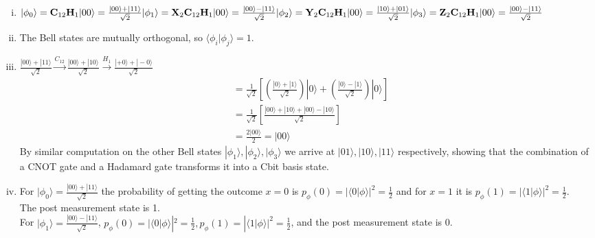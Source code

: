 \documentclass[11pt]{article}
\newenvironment{solution}{\begin{mdframed}[skipabove=\baselineskip,innertopmargin=\baselineskip,innerbottommargin=\baselineskip]
  }{\end{mdframed}}
\begin{document}
\begin{solution}
\begin{enumerate}[(i)]
    \item $
    |\phi_0\rangle = \textbf{C}_{12}\textbf{H}_1|00\rangle = \frac{|00\rangle+|11\rangle}{\sqrt{2}}\\
    |\phi_1\rangle = \textbf{X}_2\textbf{C}_{12}\textbf{H}_1|00\rangle = \frac{|00\rangle-|11\rangle}{\sqrt{2}}\\
    |\phi_2\rangle = \textbf{Y}_2\textbf{C}_{12}\textbf{H}_1|00\rangle = \frac{|10\rangle+|01\rangle}{\sqrt{2}}\\
    |\phi_3\rangle = \textbf{Z}_2\textbf{C}_{12}\textbf{H}_1|00\rangle = \frac{|00\rangle-|11\rangle}{\sqrt{2}}$
    
    \item The Bell states are mutually orthogonal, so $\langle\phi_i|\phi_j\rangle = 1$.
    
    \item $\frac{|00\rangle+|11\rangle}{\sqrt{2}} \xrightarrow{C_{12}} 
    \frac{|00\rangle+|10\rangle}{\sqrt{2}} \xrightarrow{H_1} \frac{|+0\rangle+|-0\rangle}{\sqrt{2}}$
    \begin{align*}
        &= \frac{1}{\sqrt{2}}\left[\left(\frac{|0\rangle+|1\rangle}{\sqrt{2}}\right)|0\rangle + \left(\frac{|0\rangle-|1\rangle}{\sqrt{2}}\right)|0\rangle\right] \\
        &= \frac{1}{\sqrt{2}}\left[ \frac{|00\rangle+|10\rangle+|00\rangle-|10\rangle}{\sqrt{2}} \right] \\
        &= \frac{2|00\rangle}{2} = |00\rangle
    \end{align*}
    By similar computation on the other Bell states $|\phi_1\rangle,|\phi_2\rangle,|\phi_3\rangle$ we arrive at $|01\rangle,|10\rangle,|11\rangle$ respectively, showing that the combination of a CNOT gate and a Hadamard gate transforms it into a Cbit basis state.
    \item 
    For $|\phi_0\rangle = \frac{|00\rangle+|11\rangle}{\sqrt{2}}$ the probability of getting the outcome $x = 0$ is $p_\phi(0) = |\langle0|\phi\rangle|^2 = \frac{1}{2}$ and for $x = 1$ it is $p_\phi(1) = |\langle1|\phi\rangle|^2 = \frac{1}{2}$. \\ The post measurement state is 1. \\
    
    For $|\phi_1\rangle = \frac{|00\rangle-|11\rangle}{\sqrt{2}}$,  $p_\phi(0) = |\langle0|\phi\rangle|^2 = \frac{1}{2}, p_\phi(1) = |\langle1|\phi\rangle|^2 = \frac{1}{2}$, and the post measurement state is 0. \\
    

\end{enumerate}
\end{solution}
\end{document}
